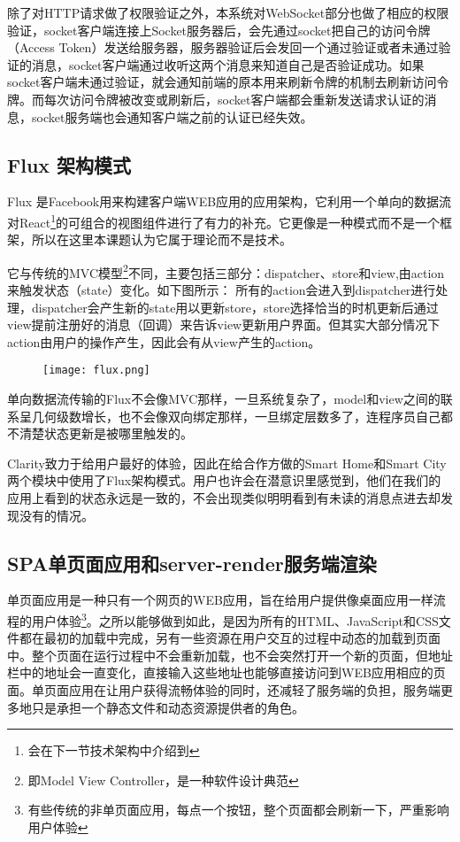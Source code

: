 除了对HTTP请求做了权限验证之外，本系统对WebSocket部分也做了相应的权限验证，socket客户端连接上Socket服务器后，会先通过socket把自己的访问令牌（Access Token）发送给服务器，服务器验证后会发回一个通过验证或者未通过验证的消息，socket客户端通过收听这两个消息来知道自己是否验证成功。如果socket客户端未通过验证，就会通知前端的原本用来刷新令牌的机制去刷新访问令牌。而每次访问令牌被改变或刷新后，socket客户端都会重新发送请求认证的消息，socket服务端也会通知客户端之前的认证已经失效。

\subsection{Flux 架构模式}
Flux 是Facebook用来构建客户端WEB应用的应用架构，它利用一个单向的数据流对React\footnote{会在下一节技术架构中介绍到}的可组合的视图组件进行了有力的补充。它更像是一种模式而不是一个框架，所以在这里本课题认为它属于理论而不是技术。

它与传统的MVC模型\footnote{即Model View Controller，是一种软件设计典范}不同，主要包括三部分：dispatcher、store和view,由action来触发状态（state）变化。如下图所示： 所有的action会进入到dispatcher进行处理，dispatcher会产生新的state用以更新store，store选择恰当的时机更新后通过view提前注册好的消息（回调）来告诉view更新用户界面。但其实大部分情况下action由用户的操作产生，因此会有从view产生的action。

\begin{figure}[!htp]
 \centering
 \texttt{[image: flux.png]}
\end{figure}
单向数据流传输的Flux不会像MVC那样，一旦系统复杂了，model和view之间的联系呈几何级数增长，也不会像双向绑定那样，一旦绑定层数多了，连程序员自己都不清楚状态更新是被哪里触发的。

Clarity致力于给用户最好的体验，因此在给合作方做的Smart Home和Smart City两个模块中使用了Flux架构模式。用户也许会在潜意识里感觉到，他们在我们的应用上看到的状态永远是一致的，不会出现类似明明看到有未读的消息点进去却发现没有的情况。

\subsection{SPA单页面应用和server-render服务端渲染}
单页面应用是一种只有一个网页的WEB应用，旨在给用户提供像桌面应用一样流程的用户体验\footnote{有些传统的非单页面应用，每点一个按钮，整个页面都会刷新一下，严重影响用户体验}。之所以能够做到如此，是因为所有的HTML、JavaScript和CSS文件都在最初的加载中完成，另有一些资源在用户交互的过程中动态的加载到页面中。整个页面在运行过程中不会重新加载，也不会突然打开一个新的页面，但地址栏中的地址会一直变化，直接输入这些地址也能够直接访问到WEB应用相应的页面。单页面应用在让用户获得流畅体验的同时，还减轻了服务端的负担，服务端更多地只是承担一个静态文件和动态资源提供者的角色。

